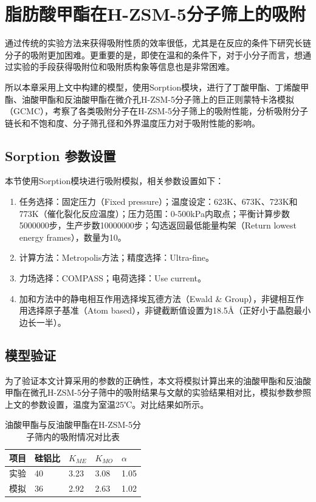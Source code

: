 \section{脂肪酸甲酯在H-ZSM-5分子筛上的吸附}
\par{通过传统的实验方法来获得吸附性质的效率很低，尤其是在反应的条件下研究长链分子的吸附更加困难。更重要的是，即使在温和的条件下，对于小分子而言，想通过实验的手段获得吸附位和吸附质构象等信息也是非常困难\cite{van1998chain}。}
\par{所以本章采用上文中构建的模型，使用Sorption模块，进行了丁酸甲酯、丁烯酸甲酯、油酸甲酯和反油酸甲酯在微介孔H-ZSM-5分子筛上的巨正则蒙特卡洛模拟（GCMC），考察了各类吸附分子在H-ZSM-5分子筛上的吸附性能，分析吸附分子链长和不饱和度、分子筛孔径和外界温度压力对于吸附性能的影响。}
\subsection{Sorption 参数设置}\label{Sorption 参数设置}
\par{本节使用Sorption模块进行吸附模拟，相关参数设置如下：}
\begin{enumerate}
    \item 任务选择：固定压力（Fixed pressure）；温度设定：623K、673K、723K和773K（催化裂化反应温度）；压力范围：0-500kPa内取点；平衡计算步数5000000步，生产步数10000000步；勾选返回最低能量构架（Return lowest energy frames），数量为10。
    \item 计算方法：Metropolis方法；精度选择：Ultra-fine。
    \item 力场选择：COMPASS\uppercase\expandafter{}；电荷选择：Use current。
    \item 加和方法中的静电相互作用选择埃瓦德方法（Ewald \& Group），非键相互作用选择原子基准（Atom based），非键截断值设置为18.5Å（正好小于晶胞最小边长一半）。
\end{enumerate}
\subsection{模型验证}\label{checking}
\par{为了验证本文计算采用的参数的正确性，本文将模拟计算出来的油酸甲酯和反油酸甲酯在微孔H-ZSM-5分子筛中的吸附结果与文献\cite{philippaerts2010selectivity}的实验结果相对比，模拟参数参照上文的参数设置，温度为室温25℃。对比结果如所示。}


\begin{table}[H]
    \centering
    \caption{油酸甲酯与反油酸甲酯在H-ZSM-5分子筛内的吸附情况对比表}
    \begin{tabular}{p{2.5cm}<{\centering}p{2.5cm}<{\centering}p{2.5cm}<{\centering}p{2.5cm}<{\centering}p{2.5cm}<{\centering}}
        \toprule
        项目&硅铝比&$K_{ME}$&$K_{MO}$&$\alpha$\\
        \midrule
        实验&40&3.23&3.08&1.05\\
        模拟&36&2.92&2.63&1.02\\
		\bottomrule
    \end{tabular}
	\label{tab:C18}
\end{table}

